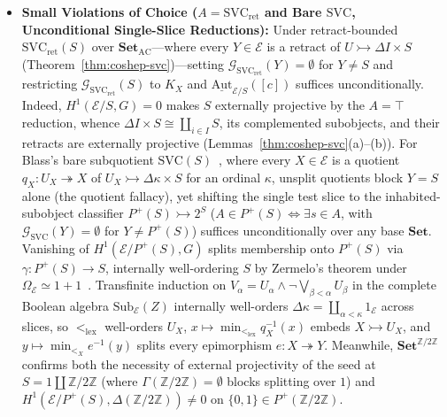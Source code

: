 \documentclass[10pt,twoside,openright]{book}
\theoremstyle{crmplain}
\theoremstyle{crmdef}
\theoremstyle{crmremark}
\begin{document}
\begin{itemize}[leftmargin=1.5em]
  \item \textbf{Small Violations of Choice ($A = \mathrm{SVC}_{\mathrm{ret}}$ and Bare $\mathrm{SVC}$, Unconditional Single-Slice Reductions):} Under retract-bounded $\mathrm{SVC}_{\mathrm{ret}}(S)$ over $\mathbf{Set}_{\mathrm{AC}}$---where every $Y \in \mathcal{E}$ is a retract of $U \rightarrowtail \Delta I \times S$ (Theorem~\ref{thm:coshep-svc})---setting $\mathcal{G}_{\mathrm{SVC}_{\mathrm{ret}}}(Y) = \emptyset$ for $Y \neq S$ and restricting $\mathcal{G}_{\mathrm{SVC}_{\mathrm{ret}}}(S)$ to $K_X$ and $\underline{\mathrm{Aut}}_{\mathcal{E}/S}([c])$ suffices unconditionally. Indeed, $H^1(\mathcal{E}/S, G) = 0$ makes $S$ externally projective by the $A = \top$ reduction, whence $\Delta I \times S \cong \coprod_{i \in I} S$, its complemented subobjects, and their retracts are externally projective (Lemmas~\ref{thm:coshep-svc}(a)--(b)). For Blass's bare subquotient $\mathrm{SVC}(S)$~\cite{Blass79}, where every $X \in \mathcal{E}$ is a quotient $q_X : U_X \twoheadrightarrow X$ of $U_X \rightarrowtail \Delta\kappa \times S$ for an ordinal $\kappa$, unsplit quotients block $Y = S$ alone (the quotient fallacy), yet shifting the single test slice to the inhabited-subobject classifier $P^+(S) \rightarrowtail 2^S$ ($A \in P^+(S) \iff \exists s \in A$, with $\mathcal{G}_{\mathrm{SVC}}(Y) = \emptyset$ for $Y \neq P^+(S)$) suffices unconditionally over any base $\mathbf{Set}$. Vanishing of $H^1(\mathcal{E}/P^+(S), G)$ splits membership onto $P^+(S)$ via $\gamma : P^+(S) \to S$, internally well-ordering $S$ by Zermelo's theorem under $\Omega_{\mathcal{E}} \simeq 1+1$~\cite[\S D4.5]{Johnstone02}. Transfinite induction on $V_\alpha = U_\alpha \wedge \neg \bigvee_{\beta < \alpha} U_\beta$ in the complete Boolean algebra $\mathrm{Sub}_{\mathcal{E}}(Z)$ internally well-orders $\Delta\kappa = \coprod_{\alpha < \kappa} 1_{\mathcal{E}}$ across slices, so $<_{\mathrm{lex}}$ well-orders $U_X$, $x \mapsto \min_{<_{\mathrm{lex}}} q_X^{-1}(x)$ embeds $X \rightarrowtail U_X$, and $y \mapsto \min_{<_X} e^{-1}(y)$ splits every epimorphism $e : X \twoheadrightarrow Y$. Meanwhile, $\mathbf{Set}^{\mathbb{Z}/2\mathbb{Z}}$ confirms both the necessity of external projectivity of the seed at $S = 1 \amalg \mathbb{Z}/2\mathbb{Z}$ (where $\Gamma(\mathbb{Z}/2\mathbb{Z}) = \emptyset$ blocks splitting over $1$) and $H^1(\mathcal{E}/P^+(S), \Delta(\mathbb{Z}/2\mathbb{Z})) \neq 0$ on $\{0,1\} \in P^+(\mathbb{Z}/2\mathbb{Z})$.

\end{itemize}
\end{document}
